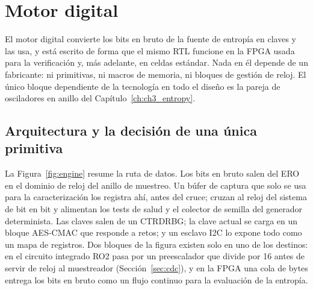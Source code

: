 \chapter{Motor digital}
\label{ch:ch4_engine}


El motor digital convierte los bits en bruto de la fuente de entropía en
claves y las usa, y está escrito de forma que el mismo \ac{RTL} funcione
en la FPGA usada para la verificación y, más adelante, en celdas
estándar. Nada en él depende de un fabricante: ni primitivas, ni macros
de memoria, ni bloques de gestión de reloj. El único bloque dependiente
de la tecnología en todo el diseño es la pareja de osciladores en anillo
del Capítulo~\ref{ch:ch3_entropy}.

\section{Arquitectura y la decisión de una única primitiva}
\label{sec:arch}

La Figura~\ref{fig:engine} resume la ruta de datos. Los bits en bruto
salen del \ac{ERO} en el dominio de reloj del anillo de muestreo. Un
búfer de captura que solo se usa para la caracterización los registra
ahí, antes del cruce; cruzan al reloj del sistema de bit en bit y
alimentan los tests de salud y el colector de semilla del generador
determinista. Las claves
salen de un \ac{CTRDRBG}; la clave actual se carga en un bloque AES-CMAC
que responde a retos; y un esclavo \ac{I2C} lo expone todo como un
mapa de registros. Dos bloques de la figura existen solo en uno de los
destinos: en el circuito integrado RO2 pasa por un preescalador que
divide por 16 antes de servir de reloj al muestreador
(Sección~\ref{sec:cdc}), y en la \ac{FPGA} una cola de bytes entrega los
bits en bruto como un flujo continuo para la evaluación de la entropía.

